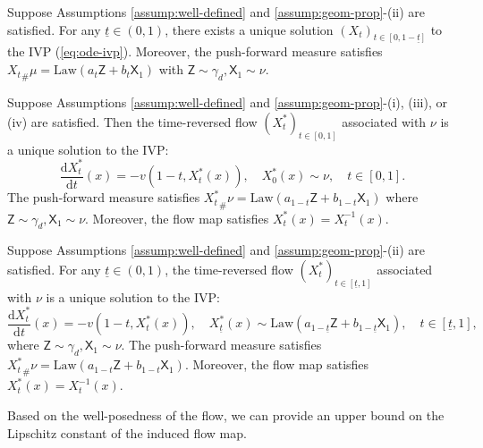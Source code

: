 \documentclass[twoside,11pt]{article}
\def\paref#1{(\ref{#1})}
\newcommand{\diff}{\mathrm{d}}
\numberwithin{equation}{section}
\begin{document}
\begin{theorem} \label{thm:well-posed-bounded}
Suppose Assumptions \ref{assump:well-defined} and \ref{assump:geom-prop}-(ii) are satisfied.
For any $\underline{t} \in (0, 1)$, there exists a unique solution $(X_t)_{t \in [0, 1-\underline{t}]}$ to the IVP \paref{eq:ode-ivp}. Moreover, the push-forward measure satisfies ${X_t}_{\#} \mu = \mathrm{Law}(a_t \mathsf{Z} + b_t \mathsf{X}_1)$ with $\mathsf{Z} \sim \gamma_d, \mathsf{X}_1 \sim \nu$.
\end{theorem}

\begin{corollary}  \label{cor:time-reve-flow}
Suppose Assumptions \ref{assump:well-defined} and \ref{assump:geom-prop}-(i), (iii), or (iv) are satisfied. Then the time-reversed flow $(X^{*}_t)_{t \in [0, 1]}$ associated with $\nu$ is a unique solution to the IVP:
\begin{equation}
    \label{eq:ode-ivp-reve}
    \frac{\diff X^{*}_t}{\diff t}(x) = -v(1-t, X^{*}_t(x)), \quad X^{*}_0(x) \sim \nu, \quad t \in [0, 1].
\end{equation}
The push-forward measure satisfies ${X^{*}_t}_{\#} \nu = \mathrm{Law}(a_{1-t} \mathsf{Z} + b_{1-t} \mathsf{X}_1)$ where $\mathsf{Z} \sim \gamma_d, \mathsf{X}_1 \sim \nu$.
Moreover, the flow map satisfies $X^{*}_t(x) = X_t^{-1}(x)$.
\end{corollary}


\begin{corollary} \label{cor:time-reve-flow-bounded}
Suppose Assumptions \ref{assump:well-defined} and \ref{assump:geom-prop}-(ii) are satisfied.
For any $\underline{t} \in (0, 1)$, the time-reversed flow $(X^{*}_t)_{t \in [\underline{t}, 1]}$ associated with $\nu$ is a unique solution to the IVP:
\begin{equation}
    \label{eq:ode-ivp-reve-bounded}
    \frac{\diff X^{*}_t}{\diff t}(x) = -v(1-t, X^{*}_t(x)), \quad X^{*}_{\underline{t}}(x) \sim \mathrm{Law}(a_{1-\underline{t}} \mathsf{Z} + b_{1-\underline{t}} \mathsf{X}_1), \quad t \in [\underline{t}, 1],
\end{equation}
where $\mathsf{Z} \sim \gamma_d, \mathsf{X}_1 \sim \nu$.
The push-forward measure satisfies ${X^{*}_t}_{\#} \nu = \mathrm{Law}(a_{1-t} \mathsf{Z} + b_{1-t} \mathsf{X}_1)$.
Moreover, the flow map satisfies $X^{*}_t(x) = X_t^{-1}(x)$.
\end{corollary}


Based on the well-posedness of the flow, we can provide an upper bound on the Lipschitz constant of the induced flow map.
\end{document}
